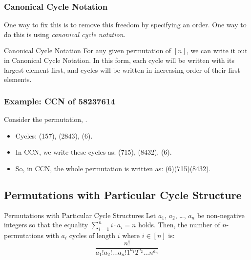\documentclass[letterpaper]{article}
\begin{document}
\subsubsection{Canonical Cycle Notation}
One way to fix this is to remove this freedom by specifying an order. One way to do this is using \emph{canonical cycle notation}. 

\begin{definition}{Canonical Cycle Notation}{}
    For any given permutation of $[n]$, we can write it out in Canonical Cycle Notation. In this form, each cycle will be written with its largest element first, and cycles will be written in increasing order of their first elements. 
\end{definition}

\subsubsection{Example: CCN of 58237614}
Consider the permutation, . 
\begin{itemize}
    \item Cycles: (157), (2843), (6).
    \item In CCN, we write these cycles as: (715), (8432), (6).
    \item So, in CCN, the whole permutation is written as: (6)(715)(8432).
\end{itemize}

\subsection{Permutations with Particular Cycle Structure}

\begin{theorem}{Permutations with Particular Cycle Structures}{}
    Let $a_1$, $a_2$, \dots, $a_n$ be non-negative integers so that the equality $\sum_{i = 1}^n i \cdot a_i = n$ holds. Then, the number of $n$-permutations with $a_i$ cycles of length $i$ where $i \in [n]$ is:
    \[\frac{n!}{a_{1}!a_{2}!\dots a_{n}!1^{a_1}2^{a_2}\dots n^{a_n}}\]
\end{theorem}
\end{document}
